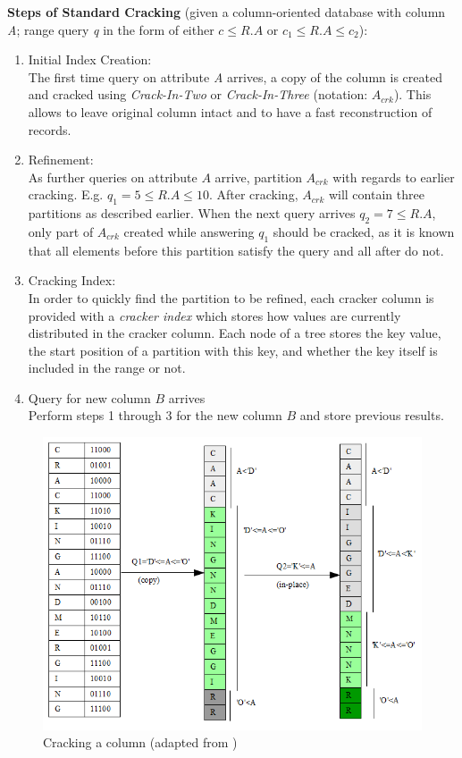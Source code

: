 \documentclass[10pt, conference, compsocconf]{IEEEtran}
\begin{document}
\textbf{Steps of Standard Cracking} (given a column-oriented database with column \textit{A}; range query \textit{q} in the form of either \textit{$c \leq R.A$} or \textit{$c_1 \leq R.A \leq c_2$}): \\
\begin{enumerate}
\item{Initial Index Creation:}\\
The first time query on attribute \textit{A} arrives, a copy of the column is created and cracked using \emph{Crack-In-Two} or \emph{Crack-In-Three} (notation:  $A_{crk}$). This allows to leave original column intact and to have a fast reconstruction of records. \\
\item{Refinement:}\\
As further queries on attribute $A$ arrive, partition $A_{crk}$ with regards to earlier cracking. E.g. $q_1 = 5 \leq R.A \leq 10$. After cracking, $A_{crk}$ will contain three partitions as described earlier. When the next query arrives $q_2 = 7 \leq R.A$, only part of $A_{crk}$ created while answering $q_1$ should be cracked, as it is known that all elements before this partition satisfy the query and all after do not.\\
\item{Cracking Index:}\\
In order to quickly find the partition to be refined, each cracker column is provided with a \emph{cracker index} which stores how values are currently distributed in the cracker column. Each node of a tree stores the key value, the start position of a partition with this key, and whether the key itself is included in the range or not.\\
\item{Query for new column $B$ arrives}\\
Perform steps 1 through 3 for the new column $B$ and store previous results.
\end{enumerate}

\begin{figure}[h]
\centering
\includegraphics[width=\columnwidth]{cracking.png}
\caption{Cracking a column (adapted from \cite{cracking})}
\end{figure}
\end{document}
